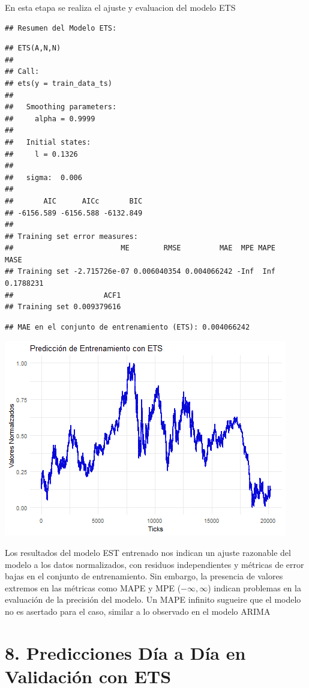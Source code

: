 \documentclass[
]{book}
\begin{document}
En esta etapa se realiza el ajuste y evaluacion del modelo ETS

\begin{verbatim}
## Resumen del Modelo ETS:
\end{verbatim}

\begin{verbatim}
## ETS(A,N,N) 
## 
## Call:
## ets(y = train_data_ts)
## 
##   Smoothing parameters:
##     alpha = 0.9999 
## 
##   Initial states:
##     l = 0.1326 
## 
##   sigma:  0.006
## 
##       AIC      AICc       BIC 
## -6156.589 -6156.588 -6132.849 
## 
## Training set error measures:
##                         ME        RMSE         MAE  MPE MAPE      MASE
## Training set -2.715726e-07 0.006040354 0.004066242 -Inf  Inf 0.1788231
##                     ACF1
## Training set 0.009379616
\end{verbatim}

\begin{verbatim}
## MAE en el conjunto de entrenamiento (ETS): 0.004066242
\end{verbatim}

\includegraphics{bookdown_time_series_files/figure-latex/unnamed-chunk-17-1.png}

Los resultados del modelo EST entrenado nos indican un ajuste razonable del modelo a los datos normalizados, con residuos independientes y métricas de error bajas en el conjunto de entrenamiento. Sin embargo, la presencia de valores extremos en las métricas como MAPE y MPE (\(-\infty, \infty\)) indican problemas en la evaluación de la precisión del modelo. Un MAPE infinito sugueire que el modelo no es asertado para el caso, similar a lo observado en el modelo ARIMA

\section{8. Predicciones Día a Día en Validación con ETS}\label{predicciones-duxeda-a-duxeda-en-validaciuxf3n-con-ets}
\end{document}
